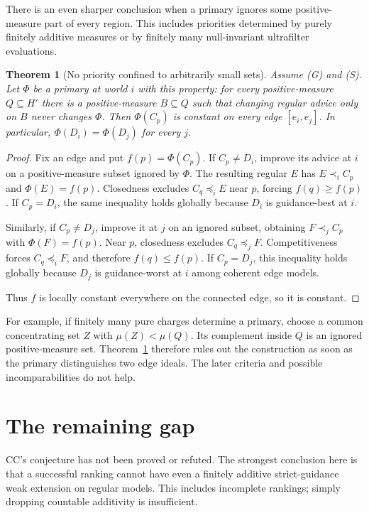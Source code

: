 \documentclass[11pt]{article}
\newtheorem{theorem}{Theorem}
\theoremstyle{remark}\newtheorem{remark}[theorem]{Remark}
\begin{document}
There is an even sharper conclusion when a primary ignores some
positive-measure part of every region. This includes priorities determined
by purely finitely additive measures or by finitely many null-invariant ultrafilter
evaluations.

\begin{theorem}[No priority confined to arbitrarily small sets]\label{thm:blind}
Assume (G) and (S). Let $\Phi$ be a primary at world $i$ with this property:
for every positive-measure $Q\subseteq H'$ there is a positive-measure
$B\subseteq Q$ such that changing regular advice only on $B$ never changes
$\Phi$. Then $\Phi(C_p)$ is constant on every edge $[e_i,e_j]$.
In particular, $\Phi(D_i)=\Phi(D_j)$ for every $j$.
\end{theorem}
\begin{proof}
Fix an edge and put $f(p)=\Phi(C_p)$. If $C_p\ne D_i$, improve its advice
at $i$ on a positive-measure subset ignored by $\Phi$. The resulting regular
$E$ has $E\prec_i C_p$ and $\Phi(E)=f(p)$. Closedness excludes
$C_q\preceq_i E$ near $p$, forcing $f(q)\ge f(p)$. If $C_p=D_i$, the same
inequality holds globally because $D_i$ is guidance-best at $i$.

Similarly, if $C_p\ne D_j$, improve it at $j$ on an ignored subset,
obtaining $F\prec_j C_p$ with $\Phi(F)=f(p)$. Near $p$, closedness excludes
$C_q\preceq_j F$. Competitiveness forces $C_q\preceq_i F$, and therefore
$f(q)\le f(p)$. If $C_p=D_j$, this inequality holds globally because $D_j$
is guidance-worst at $i$ among coherent edge models.

Thus $f$ is locally constant everywhere on the connected edge, so it is
constant.
\end{proof}

For example, if finitely many pure charges determine a primary, choose
a common concentrating set $Z$ with $\mu(Z)<\mu(Q)$. Its complement inside
$Q$ is an ignored positive-measure set. Theorem~\ref{thm:blind} therefore
rules out the construction as soon as the primary distinguishes two edge
ideals. The later criteria and possible incomparabilities do not help.

\section{The remaining gap}

CC's conjecture has not been proved or refuted. The strongest conclusion
here is that a successful ranking cannot have even a finitely additive
strict-guidance weak extension on regular models. This includes incomplete
rankings; simply dropping countable additivity is insufficient.
\end{document}
